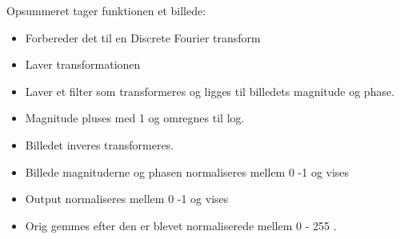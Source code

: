 \documentclass{article}
\begin{document}
Opsummeret tager funktionen et billede:
\begin{itemize}
    \item Forbereder det til en Discrete Fourier transform 
    \item Laver transformationen
    \item Laver et filter som transformeres og ligges til billedets magnitude og phase. 
    \item Magnitude pluses med 1 og omregnes til log. 
    \item Billedet inveres transformeres. 
    \item Billede magnituderne og phasen normaliseres mellem 0 -1  og vises
    \item Output normaliseres mellem 0 -1 og vises  
    \item Orig gemmes efter den er blevet normaliserede  mellem 0 - 255 .
\end{itemize}
\end{document}
